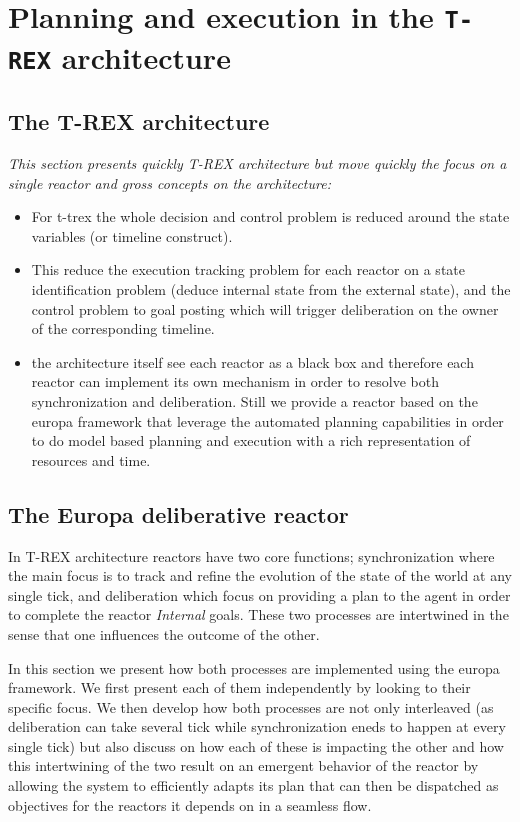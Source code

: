 \section{Planning and execution in the \texttt{T-REX} architecture}
\label{sec:arch}

\subsection{The T-REX architecture}
\label{sec:arch:trex}


{\em This section presents quickly T-REX architecture but move
  quickly the focus on a single reactor and gross concepts on the
  architecture:
  \begin{itemize}
  \item For t-trex the whole decision and control problem is reduced
    around the state variables (or timeline construct). 
  \item This reduce the execution tracking problem for each reactor on a state
    identification problem (deduce internal state from the external
    state), and the control problem to goal posting which will trigger
    deliberation on the owner of the corresponding timeline. 
  \item the architecture itself see each reactor as a black box and
    therefore each reactor can implement its own mechanism in order to
    resolve both synchronization and deliberation. Still we provide a
    reactor based on the europa framework that leverage the automated
    planning capabilities in order to do model based planning and
    execution with a rich representation of resources and time.
  \end{itemize}}


\subsection{The Europa deliberative reactor}
\label{sec:arch:europa}

In T-REX architecture reactors have two core functions;
synchronization where the main focus is to track and refine the
evolution of the state of the world at any single tick, and
deliberation which focus on providing a plan to the agent in order to
complete the reactor {\em Internal} goals. These two processes are
intertwined in the sense that one influences the outcome of the
other. 

In  this section we present how both processes are implemented using
the europa framework. We first present each of them independently by
looking to their specific focus. We then develop how both processes
are not only interleaved (as deliberation can take several tick while
synchronization eneds to happen at every single tick) but also discuss
on how each of these is impacting the other and how this intertwining 
of the two result on an emergent behavior of the reactor by allowing
the system to efficiently adapts its plan that can then be dispatched
as objectives for the reactors it depends on in a seamless flow. 

